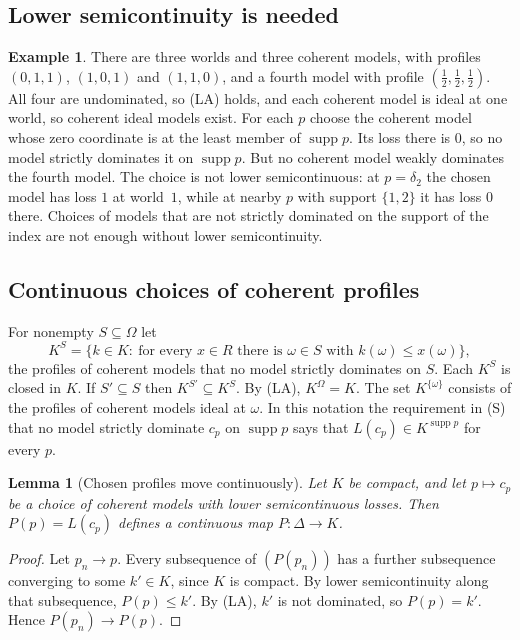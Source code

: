 \documentclass[11pt]{article}
\newtheorem{lemma}[theorem]{Lemma}
\theoremstyle{definition}
\newtheorem{example}[theorem]{Example}
\theoremstyle{remark}
\newcommand{\supp}{\operatorname{supp}}
\begin{document}
\subsection{Lower semicontinuity is needed}
\begin{example}\label{ex:continuity-needed}
There are three worlds and three coherent models, with profiles $(0,1,1)$, $(1,0,1)$ and $(1,1,0)$, and a fourth model with profile $(\tfrac12,\tfrac12,\tfrac12)$. All four are undominated, so (LA) holds, and each coherent model is ideal at one world, so coherent ideal models exist. For each $p$ choose the coherent model whose zero coordinate is at the least member of $\supp p$. Its loss there is $0$, so no model strictly dominates it on $\supp p$. But no coherent model weakly dominates the fourth model. The choice is not lower semicontinuous: at $p=\delta_2$ the chosen model has loss $1$ at world~$1$, while at nearby $p$ with support $\{1,2\}$ it has loss $0$ there. Choices of models that are not strictly dominated on the support of the index are not enough without lower semicontinuity.
\end{example}

\subsection{Continuous choices of coherent profiles}\label{sec:connect}
For nonempty $S\subseteq\Omega$ let
\[
 K^S=\{k\in K:\ \text{for every }x\in R\text{ there is }\omega\in S\text{ with }k(\omega)\le x(\omega)\},
\]
the profiles of coherent models that no model strictly dominates on $S$. Each $K^S$ is closed in $K$. If $S'\subseteq S$ then $K^{S'}\subseteq K^S$. By (LA), $K^\Omega=K$. The set $K^{\{\omega\}}$ consists of the profiles of coherent models ideal at $\omega$. In this notation the requirement in (S) that no model strictly dominate $c_p$ on $\supp p$ says that $L(c_p)\in K^{\supp p}$ for every $p$.

\begin{lemma}[Chosen profiles move continuously]\label{lem:profcont}
Let $K$ be compact, and let $p\mapsto c_p$ be a choice of coherent models with lower semicontinuous losses. Then $P(p)=L(c_p)$ defines a continuous map $P:\Delta\to K$.
\end{lemma}
\begin{proof}
Let $p_n\to p$. Every subsequence of $(P(p_n))$ has a further subsequence converging to some $k'\in K$, since $K$ is compact. By lower semicontinuity along that subsequence, $P(p)\le k'$. By (LA), $k'$ is not dominated, so $P(p)=k'$. Hence $P(p_n)\to P(p)$.
\end{proof}
\end{document}
